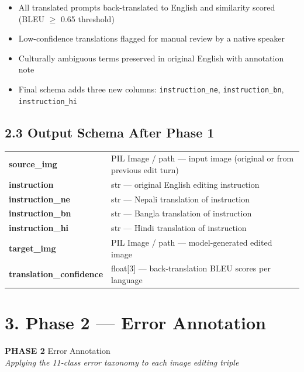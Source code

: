 \documentclass[11pt,a4paper]{article}
\begin{document}
\begin{itemize}[leftmargin=1.5em]
    \item All translated prompts back-translated to English and similarity scored (BLEU $\geq$ 0.65 threshold)
    \item Low-confidence translations flagged for manual review by a native speaker
    \item Culturally ambiguous terms preserved in original English with annotation note
    \item Final schema adds three new columns: \texttt{instruction\_ne}, \texttt{instruction\_bn}, \texttt{instruction\_hi}
\end{itemize}

\subsection{2.3 Output Schema After Phase 1}

\begin{tabularx}{\textwidth}{>{\ttfamily\bfseries}lX}
\toprule
source\_img & PIL Image / path — input image (original or from previous edit turn) \\
\rowcolor{lightgray}
instruction & str — original English editing instruction \\
instruction\_ne & str — Nepali translation of instruction \\
\rowcolor{lightgray}
instruction\_bn & str — Bangla translation of instruction \\
instruction\_hi & str — Hindi translation of instruction \\
\rowcolor{lightgray}
target\_img & PIL Image / path — model-generated edited image \\
translation\_confidence & float[3] — back-translation BLEU scores per language \\
\bottomrule
\end{tabularx}

\section{3. Phase 2 — Error Annotation}

\begin{phasebox}
\textbf{PHASE 2} \quad Error Annotation\\
\textit{Applying the 11-class error taxonomy to each image editing triple}
\end{phasebox}
\end{document}
